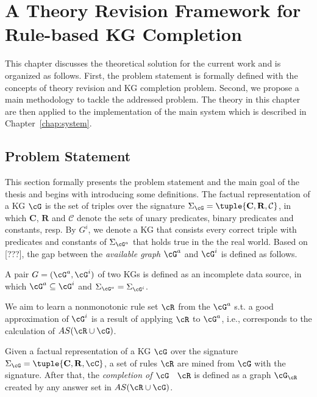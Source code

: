 \chapter{A Theory Revision Framework for Rule-based KG Completion}
\label{chap:frame}

This chapter discusses the theoretical solution for the current work and is organized as follows. First, the problem statement is formally defined with the concepts of theory revision and KG completion problem. Second, we propose a main methodology to tackle the addressed problem. The theory in this chapter are then applied to the implementation of the main system which is described in Chapter~\ref{chap:system}.

\section{Problem Statement}

This section formally presents the problem statement and the main goal of the thesis and begins with introducing some definitions. The factual representation of a KG $\cG$ is the set of triples over the signature $\Sigma_{\cG}=\tuple{\mathbf{C},\mathbf{R},\mathcal{C}}$, in which $\mathbf{C}$, $\mathbf{R}$ and $\mathcal{C}$ denote the sets of unary predicates, binary predicates and constants, resp. By $G^i$, we denote a KG that consists every correct triple with predicates and constants of $\Sigma_{\cG^a}$ that holds true in the the real world. Based on [???], the gap between the \emph{available graph} $\cG^a$ and $\cG^i$ is defined as follows.

\begin{definition} A pair $G = (\cG^a, \cG^i)$ of two KGs is defined as an incomplete data source, in which $\cG^a\subseteq \cG^i$ and $\Sigma_{\cG^a}=\Sigma_{\cG^i}$.
\end{definition}

We aim to learn a nonmonotonic rule set $\cR$ from the $\cG^a$ s.t. a good approximation of $\cG^i$ is a result of applying $\cR$ to $\cG^a$, i.e., corresponds to the calculation of $AS(\cR \cup \cG)$.

\begin{definition}\label{def:graphcompl}
Given a factual representation of a KG $\cG$ over the signature $\Sigma_{\cG}=\tuple{\mathbf{C},\mathbf{R},\cC}$, a set of rules $\cR$ are mined from $\cG$ with the signature. After that, the \emph{completion of $\cG$ \wrt\ $\cR$} is defined as a graph $\cG_{\cR}$ created by any answer set in $AS(\cR \cup \cG)$.
\end{definition}

